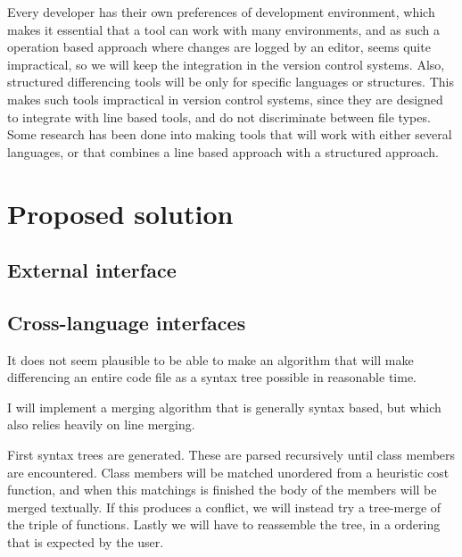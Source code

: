 \documentclass[11pt]{article}
\begin{document}
Every developer has their own preferences of development environment, which makes it essential that a tool can work with many environments, and as such a operation based approach where changes are logged by an editor, seems quite impractical, so we will keep the integration in the version control systems. Also, structured differencing tools will be only for specific languages or structures. This makes such tools impractical in version control systems, since they are designed to integrate with line based tools, and do not discriminate between file types. Some research has been done into making tools that will work with either several languages, or that combines a line based approach with a structured approach.


\clearpage

\section{Proposed solution}

\subsection{External interface}


\subsection{Cross-language interfaces}

It does not seem plausible to be able to make an algorithm that will make differencing an entire code file as a syntax tree possible in reasonable time.

I will implement a merging algorithm that is generally syntax based, but which also relies heavily on line merging.

First syntax trees are generated. These are parsed recursively until class members are encountered. Class members will be matched unordered from a heuristic cost function, and when this matchings is finished the body of the members will be merged textually. If this produces a conflict, we will instead try a tree-merge of the triple of functions.  Lastly we will have to reassemble the tree, in a ordering that is expected by the user. 
\end{document}
